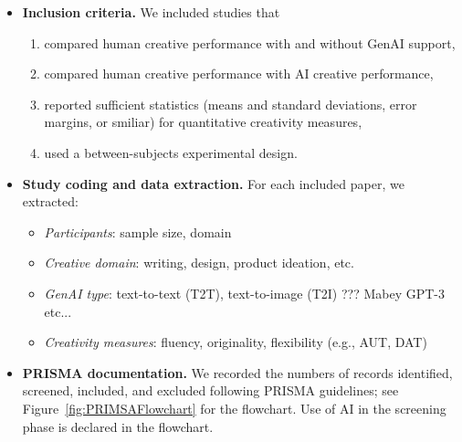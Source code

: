 \documentclass[acmsmall,authorversion]{acmart}
\begin{document}
\begin{itemize}
  \item \textbf{Inclusion criteria.}  
    We included studies that  
    \begin{enumerate}
      \item compared human creative performance with and without GenAI support, 
      \item compared human creative performance with AI creative performance, 
      \item reported sufficient statistics (means and standard deviations, error margins, or smiliar) for quantitative creativity measures,
      \item used a between-subjects experimental design.  
    \end{enumerate}

  \item \textbf{Study coding and data extraction.}  
    For each included paper, we extracted:  
    \begin{itemize}
      \item \emph{Participants}: sample size, domain 
      \item \emph{Creative domain}: writing, design, product ideation, etc.  
      \item \emph{GenAI type}: text-to-text (T2T), text-to-image (T2I)  ??? Mabey GPT-3 etc...
      \item \emph{Creativity measures}: fluency, originality, flexibility (e.g., AUT, DAT)  
    \end{itemize}

  \item \textbf{PRISMA documentation.}  
    We recorded the numbers of records identified, screened, included, and excluded following PRISMA guidelines; see Figure~\ref{fig:PRIMSAFlowchart} for the flowchart. Use of AI in the screening phase is declared in the flowchart.
\end{itemize}
\end{document}
